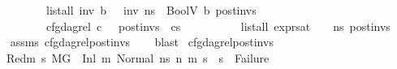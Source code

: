 \begin{isabellebody}
\ \ \ \ \ \ \ \ \ \ {\isachardoublequoteopen}list{\isacharunderscore}{\kern0pt}all\ {\isacharparenleft}{\kern0pt}{\isasymlambda}inv{\isachardot}{\kern0pt}\ {\isasymexists}b{\isachardot}{\kern0pt}\ {\isasymLambda}{\isacharcomma}{\kern0pt}{\isasymGamma}{\isacharcomma}{\kern0pt}{\isasymOmega}\ {\isasymturnstile}\ {\isasymlangle}inv{\isacharcomma}{\kern0pt}\ ns{\isasymrangle}\ {\isasymDown}\ BoolV\ b{\isacharparenright}{\kern0pt}\ post{\isacharunderscore}{\kern0pt}invs{\isachardoublequoteclose}\ \isanewline
\ \ \ \ \ \ \ \ \ \ {\isachardoublequoteopen}cfg{\isacharunderscore}{\kern0pt}dag{\isacharunderscore}{\kern0pt}rel\ c\ {\isacharbrackleft}{\kern0pt}{\isacharbrackright}{\kern0pt}\ {\isacharbrackleft}{\kern0pt}{\isacharbrackright}{\kern0pt}\ post{\isacharunderscore}{\kern0pt}invs\ {\isacharbrackleft}{\kern0pt}{\isacharbrackright}{\kern0pt}\ cs{}{\isachardoublequoteclose}\ \isanewline
\ \ \ \ \ \ \ \ \ {\isachardoublequoteopen}list{\isacharunderscore}{\kern0pt}all\ {\isacharparenleft}{\kern0pt}expr{\isacharunderscore}{\kern0pt}sat\ {\isasymLambda}\ {\isasymGamma}\ {\isasymOmega}\ ns{\isacharparenright}{\kern0pt}\ post{\isacharunderscore}{\kern0pt}invs{\isachardoublequoteclose}\isanewline
%
\isadelimproof
\ \ %
\endisadelimproof
%
\isatagproof
{}\isamarkupfalse%
\ assms\ cfg{\isacharunderscore}{\kern0pt}dag{\isacharunderscore}{\kern0pt}rel{\isacharunderscore}{\kern0pt}post{\isacharunderscore}{\kern0pt}invs\isanewline
\ \ \isamarkupfalse%
\ blast%
\endisatagproof
{\isafoldproof}%
%
\isadelimproof
\isanewline
%
\endisadelimproof
\isanewline
{}\isamarkupfalse%
\ cfg{\isacharunderscore}{\kern0pt}dag{\isacharunderscore}{\kern0pt}rel{\isacharunderscore}{\kern0pt}post{\isacharunderscore}{\kern0pt}invs{\isacharunderscore}{\kern0pt}{}{\isacharcolon}{\kern0pt}\isanewline
\ \ \ Red{\isacharcolon}{\kern0pt}{\isachardoublequoteopen}{\isasymAnd}m{}{\isacharprime}{\kern0pt}\ s{}{\isacharprime}{\kern0pt}{\isachardot}{\kern0pt}\ {\isacharparenleft}{\kern0pt}M{\isacharcomma}{\kern0pt}{\isasymLambda}{\isacharcomma}{\kern0pt}{\isasymGamma}{\isacharcomma}{\kern0pt}{\isasymOmega}{\isacharcomma}{\kern0pt}G\ {\isasymturnstile}\ {\isacharparenleft}{\kern0pt}Inl\ m{\isacharcomma}{\kern0pt}\ Normal\ ns{\isacharparenright}{\kern0pt}\ {\isacharminus}{\kern0pt}n{\isasymrightarrow}{\isacharasterisk}{\kern0pt}\ {\isacharparenleft}{\kern0pt}m{}{\isacharprime}{\kern0pt}{\isacharcomma}{\kern0pt}\ s{}{\isacharprime}{\kern0pt}{\isacharparenright}{\kern0pt}{\isacharparenright}{\kern0pt}\ {\isasymLongrightarrow}\ s{}{\isacharprime}{\kern0pt}\ {\isasymnoteq}\ Failure{\isachardoublequoteclose}\ \isanewline

\end{isabellebody}
